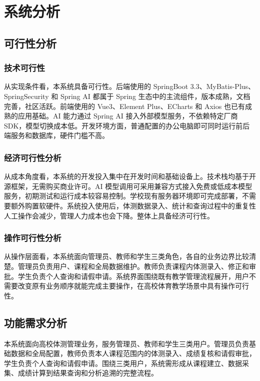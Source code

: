 
\chapter{系统分析}\label{ch:3}

\section{可行性分析}

\subsection{技术可行性}

从实现条件看，本系统具备可行性。后端使用的 SpringBoot 3.3、MyBatis-Plus、SpringSecurity 和 Spring AI 都属于 Spring 生态中的主流组件，版本成熟，文档完善，社区活跃。前端使用的 Vue3、Element Plus、ECharts 和 Axios 也已有成熟的应用基础。AI 能力通过 Spring AI 接入外部模型服务，不依赖特定厂商 SDK，模型切换成本低。开发环境方面，普通配置的办公电脑即可同时运行前后端服务和数据库，硬件门槛不高。

\subsection{经济可行性分析}

从成本角度看，本系统的开发投入集中在开发时间和基础设备上。技术栈均基于开源框架，无需购买商业许可。AI 模型调用可采用兼容方式接入免费或低成本模型服务，初期测试和运行成本较容易控制。学校现有服务器环境即可完成部署，不需要额外购置软硬件。系统投入使用后，体测数据录入、统计和查询过程中的重复性人工操作会减少，管理人力成本也会下降。整体上具备经济可行性。

\subsection{操作可行性分析}

从操作层面看，本系统面向管理员、教师和学生三类角色，各自的业务边界比较清楚。管理员负责用户、课程和全局数据维护。教师负责课程内体测录入、修正和审批。学生负责个人查询和请假申请。系统界面围绕既有教学管理流程展开，用户不需要改变原有业务顺序就能完成主要操作，在高校体育教学场景中具有操作可行性。

\section{功能需求分析}

本系统面向高校体测管理业务，服务管理员、教师和学生三类用户。管理员负责基础数据和全局配置，教师负责本人课程范围内的体测录入、成绩复核和请假审批，学生负责个人查询和请假申请。围绕三类用户，系统需形成从课程建立、数据采集、成绩计算到结果查询和分析追溯的完整流程。

